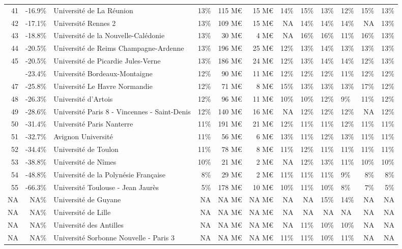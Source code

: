 \documentclass[11pt,french,landscape]{article}
\begin{document}
\begin{longtable}{rrlrrrrrrlrr}
\addlinespace
\rowcolor{gray!6}  41 & -16.9\% & Université de La Réunion & 13\% & 115 M€ & 15 M€ & 14\% & 15\% & 13\% & 12\% & 15\% & 13\%\\
42 & -17.1\% & Université Rennes 2 & 13\% & 109 M€ & 15 M€ & NA & 14\% & 14\% & 14\% & NA & 13\%\\
\rowcolor{gray!6}  43 & -18.8\% & Université de la Nouvelle-Calédonie & 13\% & 30 M€ & 4 M€ & NA & 16\% & 16\% & 11\% & 16\% & 13\%\\
44 & -20.5\% & Université de Reims Champagne-Ardenne & 13\% & 196 M€ & 25 M€ & 12\% & 13\% & 14\% & 13\% & 13\% & 13\%\\
\rowcolor{gray!6}  45 & -20.5\% & Université de Picardie Jules-Verne & 13\% & 186 M€ & 24 M€ & 12\% & 13\% & 14\% & 14\% & 12\% & 13\%\\
\addlinespace
46 & -23.4\% & Université Bordeaux-Montaigne & 12\% & 90 M€ & 11 M€ & 12\% & 12\% & 12\% & 11\% & 12\% & 12\%\\
\rowcolor{gray!6}  47 & -25.8\% & Université Le Havre Normandie & 12\% & 71 M€ & 8 M€ & 15\% & 13\% & 13\% & 13\% & 17\% & 12\%\\
48 & -26.3\% & Université d'Artois & 12\% & 96 M€ & 11 M€ & 10\% & 10\% & 12\% & 9\% & 11\% & 12\%\\
\rowcolor{gray!6}  49 & -28.6\% & Université Paris 8 - Vincennes - Saint-Denis & 12\% & 140 M€ & 16 M€ & NA & 12\% & 12\% & 12\% & NA & 12\%\\
50 & -31.4\% & Université Paris Nanterre & 11\% & 191 M€ & 21 M€ & 12\% & 11\% & 11\% & 12\% & 11\% & 11\%\\
\addlinespace
\rowcolor{gray!6}  51 & -32.7\% & Avignon Université & 11\% & 56 M€ & 6 M€ & 13\% & 11\% & 12\% & 13\% & 11\% & 11\%\\
52 & -34.4\% & Université de Toulon & 11\% & 78 M€ & 8 M€ & 11\% & 12\% & 11\% & 11\% & 11\% & 11\%\\
\rowcolor{gray!6}  53 & -38.8\% & Université de Nîmes & 10\% & 21 M€ & 2 M€ & NA & 12\% & 13\% & 11\% & 10\% & 10\%\\
54 & -48.8\% & Université de la Polynésie Française & 8\% & 29 M€ & 2 M€ & 11\% & 11\% & 11\% & 9\% & 8\% & 8\%\\
\rowcolor{gray!6}  55 & -66.3\% & Université Toulouse - Jean Jaurès & 5\% & 178 M€ & 10 M€ & 10\% & 11\% & 10\% & 8\% & 7\% & 5\%\\
\addlinespace
NA & NA\% & Université de Guyane & NA & NA M€ & NA M€ & NA & NA & 15\% & 14\% & NA & NA\\
\rowcolor{gray!6}  NA & NA\% & Université de Lille & NA & NA M€ & NA M€ & NA & NA & NA & NA & NA & NA\\
NA & NA\% & Université des Antilles & NA & NA M€ & NA M€ & NA & 11\% & 10\% & 10\% & NA & NA\\
\rowcolor{gray!6}  NA & NA\% & Université Sorbonne Nouvelle - Paris 3 & NA & NA M€ & NA M€ & 11\% & 11\% & 10\% & 11\% & NA & NA\\*
\end{longtable}
\end{document}
